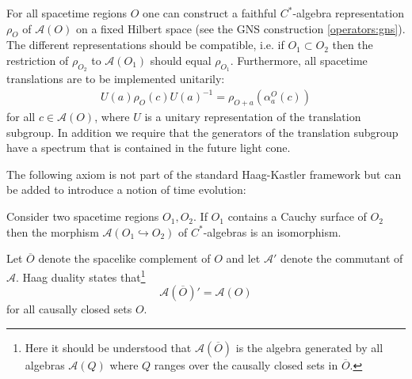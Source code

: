     \begin{axiom}[Spectrum]
        For all spacetime regions $O$ one can construct a faithful $C^*$-algebra representation $\rho_O$ of $\mathcal{A}(O)$ on a fixed Hilbert space (see the GNS construction \ref{operators:gns}). The different representations should be compatible, i.e. if $O_1\subset O_2$ then the restriction of $\rho_{O_2}$ to $\mathcal{A}(O_1)$ should equal $\rho_{O_1}$. Furthermore, all spacetime translations are to be implemented unitarily:
        \begin{gather}
            U(a)\rho_O(c)U(a)^{-1} = \rho_{O+a}(\alpha^O_a(c))
        \end{gather}
        for all $c\in\mathcal{A}(O)$, where $U$ is a unitary representation of the translation subgroup. In addition we require that the generators of the translation subgroup have a spectrum that is contained in the future light cone.
    \end{axiom}

    The following axiom is not part of the standard Haag-Kastler framework but can be added to introduce a notion of time evolution:
    \begin{axiom}
        Consider two spacetime regions $O_1, O_2$. If $O_1$ contains a Cauchy surface of $O_2$ then the morphism $\mathcal{A}(O_1\hookrightarrow O_2)$ of $C^*$-algebras is an isomorphism.
    \end{axiom}

    \begin{axiom}
        Let $\overline{O}$ denote the spacelike complement of $O$ and let $\mathcal{A}'$ denote the commutant of $\mathcal{A}$. Haag duality states that\footnote{Here it should be understood that $\mathcal{A}\left(\overline{O}\right)$ is the algebra generated by all algebras $\mathcal{A}(Q)$ where $Q$ ranges over the causally closed sets in $\overline{O}$.}
        \begin{equation}
            \mathcal{A}\left(\overline{O}\right)' = \mathcal{A}(O)
        \end{equation}
        for all causally closed sets $O$.
    \end{axiom}

